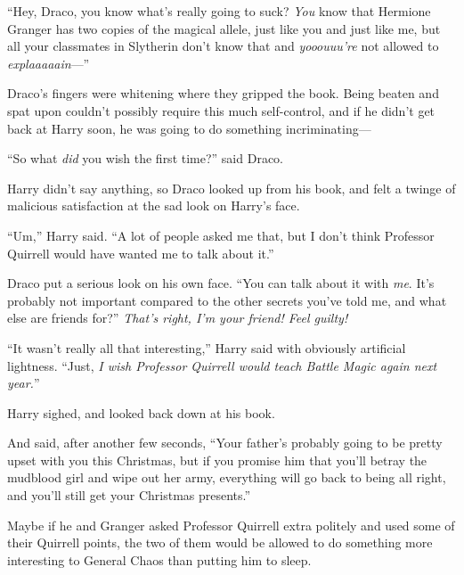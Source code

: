 “Hey, Draco, you know what’s really going to suck? \emph{You} know that Hermione Granger has two copies of the magical allele, just like you and just like me, but all your classmates in Slytherin don’t know that and \emph{yooouuu’re} not allowed to \emph{explaaaaain}—”

Draco’s fingers were whitening where they gripped the book. Being beaten and spat upon couldn’t possibly require this much self-control, and if he didn’t get back at Harry soon, he was going to do something incriminating—

“So what \emph{did} you wish the first time?” said Draco.

Harry didn’t say anything, so Draco looked up from his book, and felt a twinge of malicious satisfaction at the sad look on Harry’s face.

“Um,” Harry said. “A lot of people asked me that, but I don’t think Professor Quirrell would have wanted me to talk about it.”

Draco put a serious look on his own face. “You can talk about it with \emph{me}. It’s probably not important compared to the other secrets you’ve told me, and what else are friends for?” \emph{That’s right, I’m your friend! Feel guilty!}

“It wasn’t really all that interesting,” Harry said with obviously artificial lightness. “Just, \emph{I wish Professor Quirrell would teach Battle Magic again next year.}”

Harry sighed, and looked back down at his book.

And said, after another few seconds, “Your father’s probably going to be pretty upset with you this Christmas, but if you promise him that you’ll betray the mudblood girl and wipe out her army, everything will go back to being all right, and you’ll still get your Christmas presents.”

Maybe if he and Granger asked Professor Quirrell extra politely and used some of their Quirrell points, the two of them would be allowed to do something more interesting to General Chaos than putting him to sleep.


